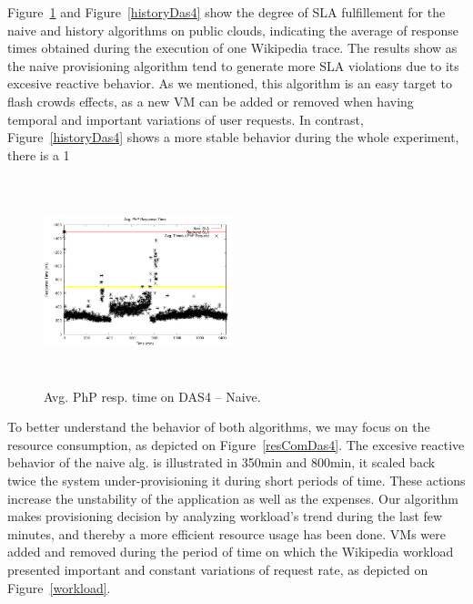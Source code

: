 Figure~\ref{naiveDas4} and Figure~\ref{historyDas4} show the degree of SLA fulfillement for the naive and history algorithms on public clouds, indicating the average of response times obtained during the execution of one Wikipedia trace. The results show as the naive provisioning algorithm tend to generate more SLA violations due to its excesive reactive behavior. As we mentioned, this algorithm is an easy target to flash crowds effects, as a new VM can be added or removed  when having temporal and important variations of user requests. In contrast, Figure~\ref{historyDas4} shows a more stable behavior during the whole experiment, there is a 1%

\begin{figure}
\begin{center}
\includegraphics[width=0.49\textwidth, height=6cm]{./images/homogeneous/avgTimeout_PhP_naive}
\end{center}
\label{naiveDas4}
\caption{Avg. PhP resp. time on DAS4 -- Naive.}
\end{figure}

To better understand the behavior of both algorithms, we may focus on the resource consumption, as depicted on Figure~\ref{resComDas4}. The excesive reactive behavior of the naive alg. is illustrated in 350min and 800min, it  scaled back twice the system under-provisioning it during short periods of time. These actions increase the unstability of the application as well as the expenses. Our algorithm makes provisioning decision by analyzing workload's trend during the last few minutes, and thereby a more efficient resource usage has been done. VMs were added and removed during the period of time on which the Wikipedia workload presented important and constant variations of request rate, as depicted on Figure~\ref{workload}.

